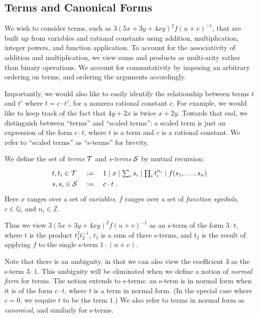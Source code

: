 \documentclass[runningheds]{llncs}
\newcommand{\QQ}{\mathbb{Q}}
\newcommand{\ZZ}{\mathbb{Z}}
\begin{document}
\subsection{Terms and Canonical Forms}
\label{subsection:terms}

We wish to consider terms, such as $3 (5x + 3y + 4 x y)^2 f(u + v)^{-1}$, that are built up from variables and rational constants using addition, multiplication, integer powers, and function application. To account for the associativity of addition and multiplication, we view sums and products as multi-arity rather than binary operations. We account for  commutativity by imposing an arbitrary ordering on terms, and ordering the arguments accordingly.

Importantly, we would also like to easily identify the relationship between terms $t$ and $t'$ where $t = c \cdot t'$, for a nonzero rational constant $c$. For example, we would like to keep track of the fact that $4 y + 2 x$ is twice $x + 2 y$. Towards that end, we distinguish between ``terms'' and ``scaled terms'': a scaled term is just an expression of the form $c \cdot t$, where $t$ is a term and $c$ is a rational constant. We refer to ``scaled terms'' as ``s-terms'' for brevity.

\begin{definition}
  We define the set of \emph{terms} ${\cal T}$ and \emph{
    s-terms} ${\cal S}$ by mutual recursion:
\[\def\arraystretch{1.3}
\begin{array}{lcl}
  t, t_i\in {\cal T} & ~:=~ & 1 \mid x \mid \mbox{$\sum_i s_i$} \mid \mbox{$\prod_i t_i^{n_i}$} \mid f(s_1,\ldots, s_n)\\
  s, s_i\in {\cal S} & ~:=~ & c \cdot t\;.
\end{array}
\]
Here $x$ ranges over a set of \emph{variables}, $f$ ranges over a set of \emph{function symbols}, $c \in \QQ$, and $n_i \in \ZZ$.
\end{definition}
Thus we view $3 (5x + 3y + 4 x y)^2 f(u + v)^{-1}$ as an s-term of the form $3 \cdot t$, where $t$ is the product $t_1^2 t_2^{-1}$, $t_1$ is a sum of three s-terms, and $t_2$ is the result of applying $f$ to the single s-term $1 \cdot (u + v)$. 

Note that there is an ambiguity, in that we can also view the coefficient $3$ as the s-term $3 \cdot 1$. This ambiguity will be eliminated when we define a notion of \emph{normal form} for terms. The notion extends to s-terms: an s-term is in normal form when it is of the form $c \cdot t$, where $t$ is a term in normal form. (In the special case where $c = 0$, we require $t$ to be the term $1$.) We also refer to terms in normal form as \emph{canonical}, and similarly for s-terms.
\end{document}
